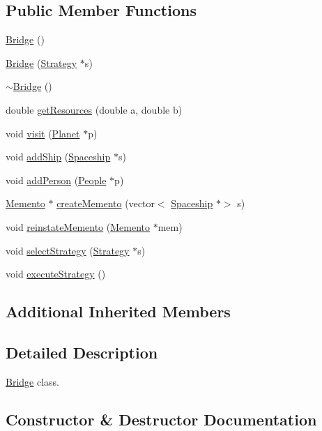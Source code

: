 \subsection*{Public Member Functions}
\begin{DoxyCompactItemize}
\item 
\hyperlink{classBridge_a275f54dafc95c9b5bbaba5e904c4fa9a}{Bridge} ()
\item 
\hyperlink{classBridge_a31994152fc209370604140c3591339c9}{Bridge} (\hyperlink{classStrategy}{Strategy} $\ast$s)
\item 
\hyperlink{classBridge_a812b325fbb4f4b589e68f11f443a7ee4}{$\sim$\+Bridge} ()
\item 
double \hyperlink{classBridge_a1508c1c9cfb44850fea31afcb7f1e403}{get\+Resources} (double a, double b)
\item 
void \hyperlink{classBridge_aa89e0ced4a914240ab354f11f7b33363}{visit} (\hyperlink{classPlanet}{Planet} $\ast$p)
\item 
void \hyperlink{classBridge_a49676496d07502909958e747ef4c3214}{add\+Ship} (\hyperlink{classSpaceship}{Spaceship} $\ast$s)
\item 
void \hyperlink{classBridge_aec10bfb9af885933640548b509144a29}{add\+Person} (\hyperlink{classPeople}{People} $\ast$p)
\item 
\hyperlink{classMemento}{Memento} $\ast$ \hyperlink{classBridge_ae6e139b786743b19ec4f1762283b6fc1}{create\+Memento} (vector$<$ \hyperlink{classSpaceship}{Spaceship} $\ast$$>$ s)
\item 
void \hyperlink{classBridge_a3d551c6ea3d807c08a32214df2589ecc}{reinstate\+Memento} (\hyperlink{classMemento}{Memento} $\ast$mem)
\item 
void \hyperlink{classBridge_a07283d7cf98c500020b1f91594f48678}{select\+Strategy} (\hyperlink{classStrategy}{Strategy} $\ast$s)
\item 
void \hyperlink{classBridge_a512402725d1a095497191968edc18555}{execute\+Strategy} ()
\end{DoxyCompactItemize}
\subsection*{Additional Inherited Members}


\subsection{Detailed Description}
\hyperlink{classBridge}{Bridge} class. 

\subsection{Constructor \& Destructor Documentation}
\mbox{\label{classBridge_a275f54dafc95c9b5bbaba5e904c4fa9a}} 
